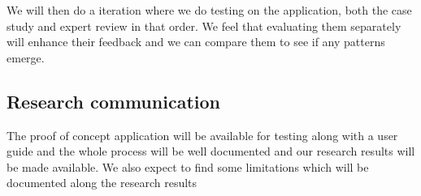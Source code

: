 We will then do a iteration where we do testing on the application, both the case study and expert review in that order. We feel that evaluating them separately will enhance their feedback and we can compare them to see if any patterns emerge.

\subsection{Research communication}
The proof of concept application will be available for testing along with a user guide and the whole process will be well documented and our research results will be made available.
We also expect to find some limitations which will be documented along the research results
